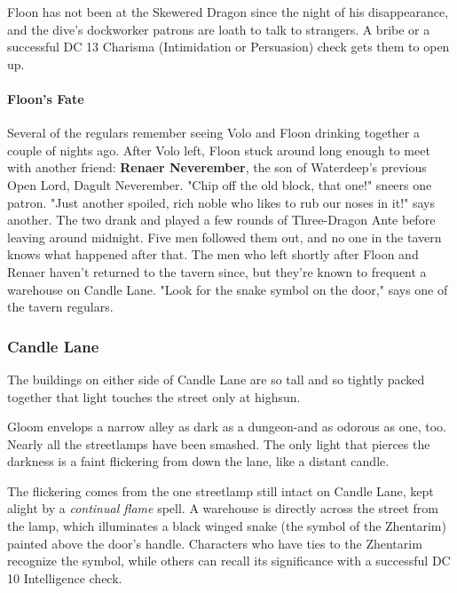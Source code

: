 \documentclass[10pt,a4paper,twoside,twocolumn,openany,nodeprecatedcode]{dndbook}
\begin{document}
Floon has not been at the Skewered Dragon since the night of his disappearance, and the dive's dockworker patrons are loath to talk to strangers. A bribe or a successful DC 13 Charisma (Intimidation or Persuasion) check gets them to open up.
\paragraph{Floon's Fate}
Several of the regulars remember seeing Volo and Floon drinking together a couple of nights ago. After Volo left, Floon stuck around long enough to meet with another friend: \textbf{Renaer Neverember}, the son of Waterdeep's previous Open Lord, Dagult Neverember. "Chip off the old block, that one!" sneers one patron. "Just another spoiled, rich noble who likes to rub our noses in it!" says another.
The two drank and played a few rounds of Three-Dragon Ante before leaving around midnight. Five men followed them out, and no one in the tavern knows what happened after that. The men who left shortly after Floon and Renaer haven't returned to the tavern since, but they're known to frequent a warehouse on Candle Lane. "Look for the snake symbol on the door," says one of the tavern regulars.
\subsubsection{Candle Lane}
The buildings on either side of Candle Lane are so tall and so tightly packed together that light touches the street only at highsun.
\begin{DndReadAloud}{}
Gloom envelops a narrow alley as dark as a dungeon-and as odorous as one, too. Nearly all the streetlamps have been smashed. The only light that pierces the darkness is a faint flickering from down the lane, like a distant candle.
\end{DndReadAloud}

The flickering comes from the one streetlamp still intact on Candle Lane, kept alight by a \textit{continual flame} spell. A warehouse is directly across the street from the lamp, which illuminates a black winged snake (the symbol of the Zhentarim) painted above the door's handle. Characters who have ties to the Zhentarim recognize the symbol, while others can recall its significance with a successful DC 10 Intelligence check.
\end{document}
